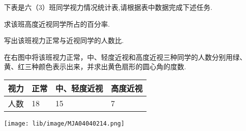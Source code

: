 下表是六（3）班同学视力情况统计表,请根据表中数据完成下述任务.

\begin{subquestions}

    \subquestion 求该班高度近视同学所占的百分率.

    \subquestion 写出该班视力正常与近视同学的人数比.

    \subquestion 在右图中将该班视力正常，中、轻度近视和高度近视三种同学的人数分别用绿、黄、红三种颜色表示出来，并求出黄色扇形的圆心角的度数.

\end{subquestions}

\begin{center}

    \begin{tabular}{|p{2cm}<{\centering}|p{2cm}<{\centering}|p{3cm}<{\centering}|p{3cm}<{\centering}|}

         \hline

         视力&正常&中、轻度近视&高度近视 \\

         \hline

        人数&18&15&7 \\

        \hline

    \end{tabular}

\end{center}

\begin{center}

    \texttt{[image: lib/image/MJA04040214.png]}

\end{center}



